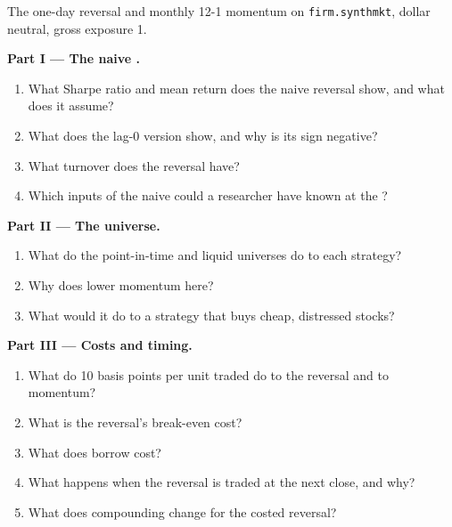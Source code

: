 \begin{problem}\label{pb:rs:vectorised-backtests:1}
The one-day reversal and monthly 12-1 momentum on \texttt{firm.synthmkt}, dollar neutral, gross exposure 1.

\medskip\noindent\textbf{Part I --- The naive .}
\begin{enumerate}
\item What Sharpe ratio and mean return does the naive reversal  show, and what does it assume?
\item What does the lag-0 version show, and why is its sign negative?
\item What turnover does the reversal have?
\item Which inputs of the naive  could a researcher have known at the ?
\end{enumerate}

\medskip\noindent\textbf{Part II --- The universe.}
\begin{enumerate}[resume]
\item What do the point-in-time and liquid universes do to each strategy?
\item Why does  lower momentum here?
\item What would it do to a strategy that buys cheap, distressed stocks?
\end{enumerate}

\medskip\noindent\textbf{Part III --- Costs and timing.}
\begin{enumerate}[resume]
\item What do 10 basis points per unit traded do to the reversal and to momentum?
\item What is the reversal's break-even cost?
\item What does borrow cost?
\item What happens when the reversal is traded at the next close, and why?
\item What does compounding change for the costed reversal?
\end{enumerate}


\end{problem}
